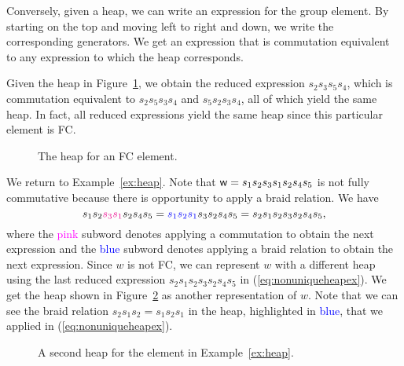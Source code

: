     Conversely, given a heap, we can write an expression for the group element.
    By starting on the top and moving left to right and down, we write the corresponding generators. We get an expression that is commutation equivalent to any expression to which the heap corresponds.
    
\begin{example} Given the heap in Figure~\ref{fig:heapToRedExp}, we obtain the reduced expression $s_2 s_3 s_5 s_4$, which is commutation equivalent to $s_2s_5s_3s_4$ and $s_5s_2s_3s_4$, all of which yield the same heap. In fact, all reduced expressions yield the same heap since this particular element is FC.

\begin{center} \begin{figure}[H] \centering
{}
\caption{The heap for an FC element.}\label{fig:heapToRedExp}
\end{figure} \end{center}
\end{example}
   
\begin{example} We return to Example~\ref{ex:heap}. Note that $\mathsf{w} = s_1s_2s_3s_1s_2s_4s_5$ is not fully commutative because there is opportunity to apply a braid relation.
    We have
    \begin{equation} \label{eq:nonuniqueheapex} 
        s_1s_2\textcolor{magenta}{s_3s_1}s_2s_4s_5 = \textcolor{blue}{s_1s_2s_1}
        s_3s_2s_4s_5 = s_2s_1s_2s_3s_2s_4s_5,
    \end{equation}
where the \textcolor{magenta}{pink} subword denotes applying a commutation to obtain the next expression and the \textcolor{blue}{blue} subword denotes applying a braid relation to obtain the next expression.
    Since $w$ is not FC, we can represent $w$ with a different heap using the last reduced expression $s_2s_1s_2s_3s_2s_4s_5$ in (\ref{eq:nonuniqueheapex}).
    We get the heap shown in Figure~\ref{fig:nonuniqueheapex} as another representation of $w$. Note that we can see the braid relation $s_2s_1s_2 = s_1s_2s_1$ in the heap, highlighted in \textcolor{blue}{blue}, that we applied in (\ref{eq:nonuniqueheapex}).
\begin{center} \begin{figure}[H] \centering
{}
\caption{A second heap for the element in Example~\ref{ex:heap}.} \label{fig:nonuniqueheapex}
\end{figure} \end{center}
\end{example}

